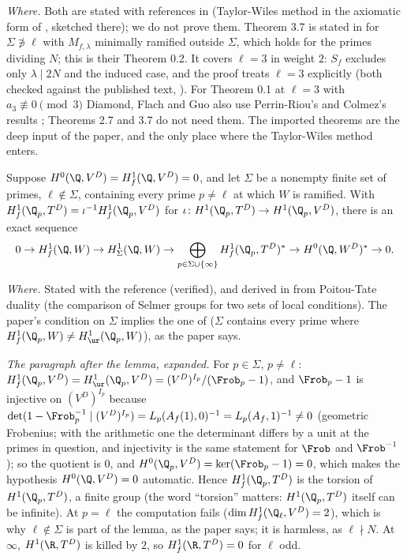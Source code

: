 \begin{sloppypar}
\noindent\emph{Where.} Both are stated with references in  (Taylor-Wiles method in the axiomatic form of \cite{DFG04}, sketched there); we do not prove
them. Theorem 3.7 is stated in \cite{DFG04} for $\Sigma\not\ni\ell$ with $M_{f,\lambda}$ minimally ramified outside $\Sigma$, which holds for the primes dividing $N$; this is their Theorem 0.2. It
covers $\ell=3$ in weight $2$: $S_f$ excludes only $\lambda\mid2N$ and the induced case, and the proof treats $\ell=3$ explicitly (both checked against the published text, ).
For Theorem 0.1 at $\ell=3$ with $a_3\not\equiv0\pmod3$ Diamond, Flach and Guo also use Perrin-Riou's and Colmez's results \cite[Proposition 2.16]{DFG04}; Theorems 2.7 and 3.7 do not need them.
The imported theorems are the deep input of the paper, and the only place where the Taylor-Wiles method enters.

\begin{lemma}\label{lem:paper:dfg21}
Suppose $H^0(\Q,V^D)=H^1_f(\Q,V^D)=0$, and let $\Sigma$ be a nonempty finite set of primes, $\ell\notin\Sigma$, containing every prime $p\ne\ell$ at which $W$ is ramified. With
$H^1_f(\Q_p,T^D)=\iota^{-1}H^1_f(\Q_p,V^D)$ for $\iota\colon H^1(\Q_p,T^D)\to H^1(\Q_p,V^D)$, there is an exact sequence
\[
0\to H^1_f(\Q,W)\to H^1_\Sigma(\Q,W)\to\bigoplus_{p\in\Sigma\cup\{\infty\}}H^1_f(\Q_p,T^D)^*\to H^0(\Q,W^D)^*\to0.
\]
\end{lemma}

\noindent\emph{Where.} Stated with the reference \cite[Lemma 2.1]{DFG04} (verified), and derived in  from Poitou-Tate duality (the comparison of
Selmer groups for two sets of local conditions). The paper's condition on $\Sigma$ implies the one of \cite{DFG04} ($\Sigma$ contains every prime where $H^1_f(\Q_p,W)\ne H^1_{\ur}(\Q_p,W)$), as
the paper says.

\emph{The paragraph after the lemma, expanded.} For $p\in\Sigma$, $p\ne\ell$: $H^1_f(\Q_p,V^D)=H^1_{\ur}(\Q_p,V^D)=(V^D)^{I_p}/(\Frob_p-1)$, and $\Frob_p-1$ is injective on $(V^D)^{I_p}$ because
$\det(1-\Frob_p^{-1}\mid(V^D)^{I_p})=L_p(A_f(1),0)^{-1}=L_p(A_f,1)^{-1}\ne0$ (geometric Frobenius; with the arithmetic one the determinant differs by a unit at the primes in question, and
injectivity is the same statement for $\Frob$ and $\Frob^{-1}$); so the quotient is $0$, and $H^0(\Q_p,V^D)=\ker(\Frob_p-1)=0$, which makes the hypothesis $H^0(\Q,V^D)=0$ automatic.
Hence $H^1_f(\Q_p,T^D)$ is the torsion of $H^1(\Q_p,T^D)$, a finite group (the word ``torsion'' matters: $H^1(\Q_p,T^D)$ itself can be infinite). At $p=\ell$ the computation fails
($\dim H^1_f(\Q_\ell,V^D)=2$), which is why $\ell\notin\Sigma$ is part of the lemma, as the paper says; it is harmless, as $\ell\nmid N$. At $\infty$, $H^1(\R,T^D)$
is killed by $2$, so $H^1_f(\R,T^D)=0$ for $\ell$ odd.


\end{sloppypar}
